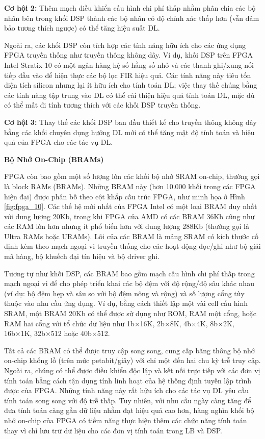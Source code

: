 \documentclass[a4paper]{article}
\begin{document}
\textbf{Cơ hội 2:} Thêm mạch điều khiển cấu hình chi phí thấp nhằm phân chia các bộ nhân bên trong khối DSP thành các bộ nhân có độ chính xác thấp hơn (vẫn đảm bảo tương thích ngược) có thể tăng hiệu suất DL.

Ngoài ra, các khối DSP còn tích hợp các tính năng hữu ích cho các ứng dụng FPGA truyền thống như truyền thông không dây. Ví dụ, khối DSP trên FPGA Intel Stratix 10 có một ngân hàng hệ số hằng số nhỏ và các thanh ghi/xung nối tiếp đầu vào để hiện thực các bộ lọc FIR hiệu quả. Các tính năng này tiêu tốn diện tích silicon nhưng lại ít hữu ích cho tính toán DL; việc thay thế chúng bằng các tính năng tập trung vào DL có thể cải thiện hiệu quả tính toán DL, mặc dù có thể mất đi tính tương thích với các khối DSP truyền thống.

\textbf{Cơ hội 3:} Thay thế các khối DSP ban đầu thiết kế cho truyền thông không dây bằng các khối chuyên dụng hướng DL mới có thể tăng mật độ tính toán và hiệu quả của FPGA cho các tác vụ DL.

\textbf{Bộ Nhớ On-Chip (BRAMs)}

FPGA còn bao gồm một số lượng lớn các khối bộ nhớ SRAM on-chip, thường gọi là block RAMs (BRAMs). Những BRAM này (hơn 10.000 khối trong các FPGA hiện đại) được phân bố theo cột khắp cấu trúc FPGA, như minh họa ở Hình \ref{fig:fpga_10}. Các thế hệ mới nhất của FPGA Intel có một loại BRAM duy nhất với dung lượng 20Kb, trong khi FPGA của AMD có các BRAM 36Kb cũng như các RAM lớn hơn nhưng ít phổ biến hơn với dung lượng 288Kb (thường gọi là Ultra RAMs hoặc URAMs). Lõi của các BRAM là mảng SRAM có kích thước cố định kèm theo mạch ngoại vi truyền thống cho các hoạt động đọc/ghi như bộ giải mã hàng, bộ khuếch đại tín hiệu và bộ driver ghi.

Tương tự như khối DSP, các BRAM bao gồm mạch cấu hình chi phí thấp trong mạch ngoại vi để cho phép triển khai các bộ đệm với độ rộng/độ sâu khác nhau (ví dụ: bộ đệm hẹp và sâu so với bộ đệm nông và rộng) và số lượng cổng tùy thuộc vào nhu cầu ứng dụng. Ví dụ, bằng cách thiết lập một vài cell cấu hình SRAM, một BRAM 20Kb có thể được sử dụng như ROM, RAM một cổng, hoặc RAM hai cổng với tổ chức dữ liệu như 1b×16K, 2b×8K, 4b×4K, 8b×2K, 16b×1K, 32b×512 hoặc 40b×512.

Tất cả các BRAM có thể được truy cập song song, cung cấp băng thông bộ nhớ on-chip khổng lồ (trên mức petabit/giây) với chỉ một đến hai chu kỳ trễ truy cập. Ngoài ra, chúng có thể được điều khiển độc lập và kết nối trực tiếp với các đơn vị tính toán bằng cách tận dụng tính linh hoạt của hệ thống định tuyến lập trình được của FPGA. Những tính năng này rất hữu ích cho các tác vụ DL yêu cầu tính toán song song với độ trễ thấp. Tuy nhiên, với nhu cầu ngày càng tăng để đưa tính toán càng gần dữ liệu nhằm đạt hiệu quả cao hơn, hàng nghìn khối bộ nhớ on-chip của FPGA có tiềm năng thực hiện thêm các chức năng tính toán thay vì chỉ lưu trữ dữ liệu cho các đơn vị tính toán trong LB và DSP.
\end{document}

